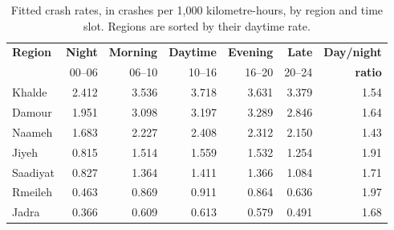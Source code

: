 \documentclass[11pt]{article}
\begin{document}
\begin{table}[htbp]
\centering
\caption{Fitted crash rates, in crashes per 1{,}000 kilometre-hours, by region
and time slot. Regions are sorted by their daytime rate.}
\label{tab:rates}
\small
\begin{tabular}{@{}lrrrrrr@{}}
\toprule
\textbf{Region} & \textbf{Night} & \textbf{Morning} & \textbf{Daytime} & \textbf{Evening} & \textbf{Late} & \textbf{Day/night} \\
       & 00--06 & 06--10 & 10--16 & 16--20 & 20--24 & \textbf{ratio} \\
\midrule
Khalde   & 2.412 & 3.536 & 3.718 & 3.631 & 3.379 & 1.54 \\
Damour   & 1.951 & 3.098 & 3.197 & 3.289 & 2.846 & 1.64 \\
Naameh   & 1.683 & 2.227 & 2.408 & 2.312 & 2.150 & 1.43 \\
Jiyeh    & 0.815 & 1.514 & 1.559 & 1.532 & 1.254 & 1.91 \\
Saadiyat & 0.827 & 1.364 & 1.411 & 1.366 & 1.084 & 1.71 \\
Rmeileh  & 0.463 & 0.869 & 0.911 & 0.864 & 0.636 & 1.97 \\
Jadra    & 0.366 & 0.609 & 0.613 & 0.579 & 0.491 & 1.68 \\
\bottomrule
\end{tabular}
\end{table}
\end{document}
